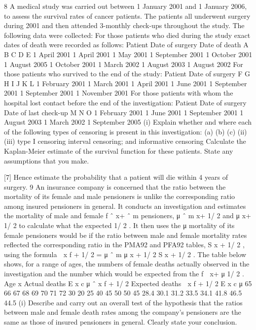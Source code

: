 \documentclass[a4paper,12pt]{article}
\begin{document}
\begin{enumerate}

8
A medical study was carried out between 1 January 2001 and 1 January 2006, to
assess the survival rates of cancer patients. The patients all underwent surgery during
2001 and then attended 3-monthly check-ups throughout the study.
The following data were collected:
For those patients who died during the study exact dates of death were recorded as
follows:
Patient Date of surgery Date of death
A
B
C
D
E 1 April 2001
1 April 2001
1 May 2001
1 September 2001
1 October 2001 1 August 2005
1 October 2001
1 March 2002
1 August 2003
1 August 2002
For those patients who survived to the end of the study:
Patient Date of surgery
F
G
H
I
J
K
L 1 February 2001
1 March 2001
1 April 2001
1 June 2001
1 September 2001
1 September 2001
1 November 2001
For those patients with whom the hospital lost contact before the end of the
investigation:
Patient Date of surgery Date of last check-up
M
N
O 1 February 2001
1 June 2001
1 September 2001 1 August 2003
1 March 2002
1 September 2005
(i)
Explain whether and where each of the following types of censoring is present
in this investigation:
(a)
(b)
(c)
(ii)
(iii)
type I censoring
interval censoring; and
informative censoring
Calculate the Kaplan-Meier estimate of the survival function for these
patients. State any assumptions that you make.

[7]
Hence estimate the probability that a patient will die within 4 years of surgery.
9
An insurance company is concerned that the ratio between the mortality of its female
and male pensioners is unlike the corresponding ratio among insured pensioners in
general. It conducts an investigation and estimates the mortality of male and female
f
ˆ x+
ˆ m
pensioners, μ ˆ m
x+ 1/ 2 and μ
x+ 1/ 2 to calculate what the expected
1/ 2 . It then uses the μ
mortality of its female pensioners would be if the ratio between male and female
mortality rates reflected the corresponding ratio in the PMA92 and PFA92 tables,
S x + 1/ 2 , using the formula
 x f + 1/ 2 = μ ˆ m
μ
x + 1/ 2 S x + 1/ 2 .
The table below shows, for a range of ages, the numbers of female deaths actually
observed in the investigation and the number which would be expected from the
f
 x+
μ
1/ 2 .
Age
x Actual deaths
E x c μ ˆ x f + 1/ 2 Expected deaths
 x f + 1/ 2
E x c μ
65
66
67
68
69
70
71
72 30
20
25
40
45
50
50
45 28.4
30.1
31.2
33.5
34.1
41.8
46.5
44.5
(i) Describe and carry out an overall test of the hypothesis that the ratios between
male and female death rates among the company’s pensioners are the same as
those of insured pensioners in general. Clearly state your conclusion.


\end{enumerate}
\end{document}
